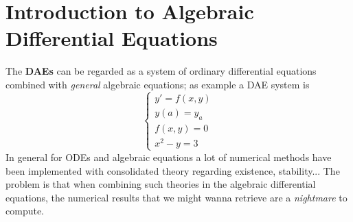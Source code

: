 \chapter{Introduction to Algebraic Differential Equations}
	
	The  \textbf{DAEs} can be regarded as a system of ordinary differential equations combined with \textit{general} algebraic equations; as example a DAE system is
	\[ \begin{cases}
		y' = f(x,y) \\
		y(a) = y_a \\
		f(x,y) = 0 \\
		x^2-y = 3
	\end{cases} \] 
	In general for ODEs and algebraic equations a lot of numerical methods have been implemented with consolidated theory regarding existence, stability... The problem is that when combining such theories in the algebraic differential equations, the numerical results that we might wanna retrieve are a \textit{nightmare} to compute.
	

